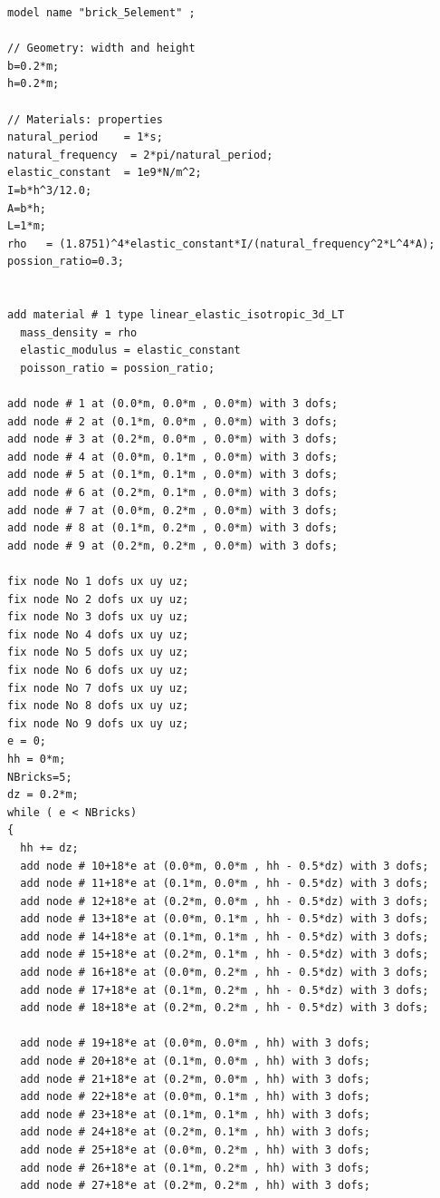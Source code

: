 \documentclass[fleqn,11pt]{article}
\begin{document}
\begin{lstlisting}
model name "brick_5element" ;

// Geometry: width and height
b=0.2*m;
h=0.2*m;

// Materials: properties
natural_period    = 1*s;        
natural_frequency  = 2*pi/natural_period;
elastic_constant  = 1e9*N/m^2; 
I=b*h^3/12.0;
A=b*h;
L=1*m;
rho   = (1.8751)^4*elastic_constant*I/(natural_frequency^2*L^4*A);
possion_ratio=0.3;


add material # 1 type linear_elastic_isotropic_3d_LT
  mass_density = rho
  elastic_modulus = elastic_constant
  poisson_ratio = possion_ratio;

add node # 1 at (0.0*m, 0.0*m , 0.0*m) with 3 dofs;
add node # 2 at (0.1*m, 0.0*m , 0.0*m) with 3 dofs;
add node # 3 at (0.2*m, 0.0*m , 0.0*m) with 3 dofs;
add node # 4 at (0.0*m, 0.1*m , 0.0*m) with 3 dofs;
add node # 5 at (0.1*m, 0.1*m , 0.0*m) with 3 dofs;
add node # 6 at (0.2*m, 0.1*m , 0.0*m) with 3 dofs;
add node # 7 at (0.0*m, 0.2*m , 0.0*m) with 3 dofs;
add node # 8 at (0.1*m, 0.2*m , 0.0*m) with 3 dofs;
add node # 9 at (0.2*m, 0.2*m , 0.0*m) with 3 dofs;

fix node No 1 dofs ux uy uz;
fix node No 2 dofs ux uy uz;
fix node No 3 dofs ux uy uz;
fix node No 4 dofs ux uy uz;
fix node No 5 dofs ux uy uz;
fix node No 6 dofs ux uy uz;
fix node No 7 dofs ux uy uz;
fix node No 8 dofs ux uy uz;
fix node No 9 dofs ux uy uz;
e = 0;
hh = 0*m;
NBricks=5;
dz = 0.2*m;
while ( e < NBricks)
{
  hh += dz;
  add node # 10+18*e at (0.0*m, 0.0*m , hh - 0.5*dz) with 3 dofs;
  add node # 11+18*e at (0.1*m, 0.0*m , hh - 0.5*dz) with 3 dofs;
  add node # 12+18*e at (0.2*m, 0.0*m , hh - 0.5*dz) with 3 dofs;
  add node # 13+18*e at (0.0*m, 0.1*m , hh - 0.5*dz) with 3 dofs;
  add node # 14+18*e at (0.1*m, 0.1*m , hh - 0.5*dz) with 3 dofs;
  add node # 15+18*e at (0.2*m, 0.1*m , hh - 0.5*dz) with 3 dofs;
  add node # 16+18*e at (0.0*m, 0.2*m , hh - 0.5*dz) with 3 dofs;
  add node # 17+18*e at (0.1*m, 0.2*m , hh - 0.5*dz) with 3 dofs;
  add node # 18+18*e at (0.2*m, 0.2*m , hh - 0.5*dz) with 3 dofs;
  
  add node # 19+18*e at (0.0*m, 0.0*m , hh) with 3 dofs;
  add node # 20+18*e at (0.1*m, 0.0*m , hh) with 3 dofs;
  add node # 21+18*e at (0.2*m, 0.0*m , hh) with 3 dofs;
  add node # 22+18*e at (0.0*m, 0.1*m , hh) with 3 dofs;
  add node # 23+18*e at (0.1*m, 0.1*m , hh) with 3 dofs;
  add node # 24+18*e at (0.2*m, 0.1*m , hh) with 3 dofs;
  add node # 25+18*e at (0.0*m, 0.2*m , hh) with 3 dofs;
  add node # 26+18*e at (0.1*m, 0.2*m , hh) with 3 dofs;
  add node # 27+18*e at (0.2*m, 0.2*m , hh) with 3 dofs;


\end{lstlisting}
\end{document}
